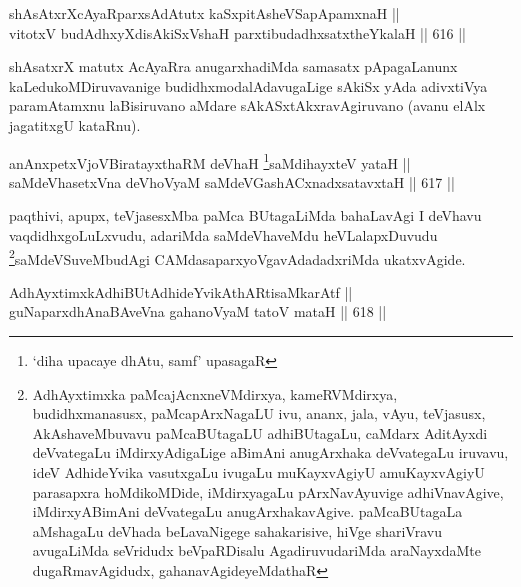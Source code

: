 
\begin{shl}
shAsAtxrXcAyaRparxsAdAtutx kaSxpitAsheVSapApamxnaH || \\
vitotxV budAdhxyXdisAkiSxVshaH parxtibudadhxsatxtheYkalaH \hfill || 616 ||  
\end{shl}

\begin{artha}
shAsatxrX matutx AcAyaRra anugarxhadiMda samasatx pApagaLanunx kaLedukoMDiruvavanige budidhxmodalAdavugaLige sAkiSx yAda adivxtiVya paramAtamxnu laBisiruvano aMdare sAkASxtAkxravAgiruvano (avanu elAlx jagatitxgU kataRnu).
\end{artha} 


\begin{shl}
anAnxpetxVjoVBiratayxthaRM deVhaH \footnote{`diha upacaye dhAtu, samf' upasagaR}saMdihayxteV yataH || \\
saMdeVhasetxVna deVhoV\s yaM saMdeVGashACxnadxsatavxtaH \hfill || 617 ||  
\end{shl}

\begin{artha}
paqthivi, apupx, teVjasesxMba paMca BUtagaLiMda bahaLavAgi
I deVhavu vaqdidhxgoLuLxvudu, adariMda saMdeVhaveMdu
heVLalapxDuvudu \footnote{AdhAyxtimxka paMcajAcnxneVMdirxya,
kameRVMdirxya, budidhxmanasusx, paMcapArxNagaLU ivu, ananx, jala,
vAyu, teVjasusx, AkAshaveMbuvavu paMcaBUtagaLU adhiBUtagaLu, caMdarx
AditAyxdi deVvategaLu iMdirxyAdigaLige aBimAni anugArxhaka
deVvategaLu iruvavu, ideV AdhideYvika vasutxgaLu ivugaLu
muKayxvAgiyU amuKayxvAgiyU parasapxra hoMdikoMDide, iMdirxyagaLu
pArxNavAyuvige adhiVnavAgive, iMdirxyABimAni deVvategaLu
anugArxhakavAgive. paMcaBUtagaLa aMshagaLu deVhada beLavaNigege
sahakarisive, hiVge shariVravu avugaLiMda seVridudx beVpaRDisalu
AgadiruvudariMda araNayxdaMte dugaRmavAgidudx, gahanavAgideyeMdathaR}saMdeVSuveMbudAgi CAMdasaparxyoVgavAdadadxriMda ukatxvAgide.
\end{artha}


\begin{shl}
AdhAyxtimxkAdhiBUtAdhideYvikAthARtisaMkarAtf || \\
guNaparxdhAnaBAveVna gahanoV\s yaM tatoV mataH \hfill || 618 ||  
\end{shl}

